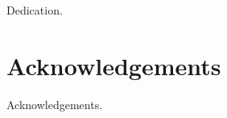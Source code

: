 \pagestyle{empty}

\title{\LARGE{\thesistitle} \\[3cm]}

\author{\Large{\authorname} \\ \Large{\collegename} \\[3cm]}

\date{\DPhiltext \\[1cm] \DPhildate}

\maketitle

\cleardoublepage

\cleardoublepage

\begin{abstract}
\abstext
\end{abstract}

\cleardoublepage
\pagestyle{plain}
\raggedbottom

\vspace*{10cm}

Dedication.

\cleardoublepage

\chapter*{Acknowledgements}

Acknowledgements.

\cleardoublepage

\tableofcontents
\listoffigures
\listoftables

